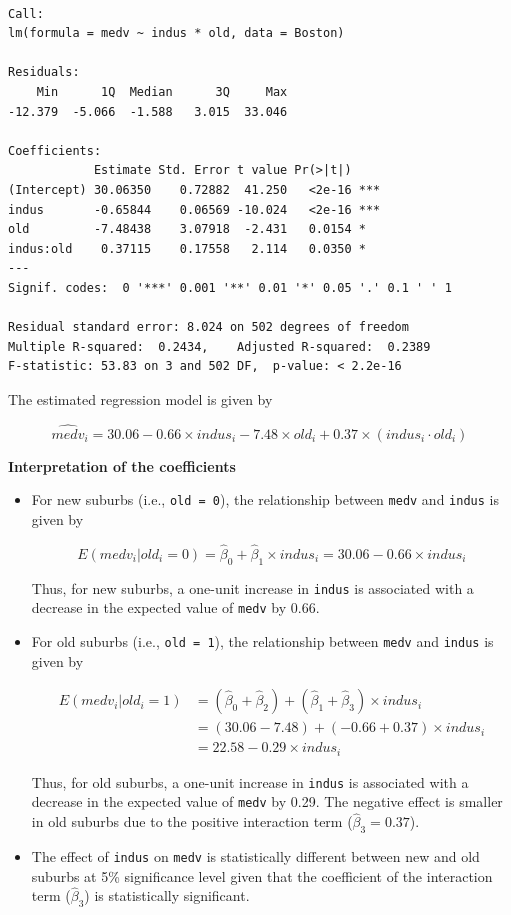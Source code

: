 \documentclass[
  12pt,
  letterpaper,
]{scrbook}
\theoremstyle{plain}
\theoremstyle{definition}
\theoremstyle{remark}
\begin{document}
\begin{verbatim}

Call:
lm(formula = medv ~ indus * old, data = Boston)

Residuals:
    Min      1Q  Median      3Q     Max 
-12.379  -5.066  -1.588   3.015  33.046 

Coefficients:
            Estimate Std. Error t value Pr(>|t|)    
(Intercept) 30.06350    0.72882  41.250   <2e-16 ***
indus       -0.65844    0.06569 -10.024   <2e-16 ***
old         -7.48438    3.07918  -2.431   0.0154 *  
indus:old    0.37115    0.17558   2.114   0.0350 *  
---
Signif. codes:  0 '***' 0.001 '**' 0.01 '*' 0.05 '.' 0.1 ' ' 1

Residual standard error: 8.024 on 502 degrees of freedom
Multiple R-squared:  0.2434,    Adjusted R-squared:  0.2389 
F-statistic: 53.83 on 3 and 502 DF,  p-value: < 2.2e-16
\end{verbatim}

The estimated regression model is given by

\[
\widehat{medv}_i = 30.06 - 0.66 \times indus_i - 7.48 \times old_i + 0.37 \times (indus_i \cdot old_i)
\]

{\textbf{Interpretation of the coefficients}}

\begin{itemize}
\item
  For new suburbs (i.e., \texttt{old\ =\ 0}), the relationship between
  \texttt{medv} and \texttt{indus} is given by

  \[
  E(medv_i | old_i = 0) = \hat{\beta}_0 + \hat{\beta}_1 \times indus_i = 30.06 - 0.66 \times indus_i
  \]

  Thus, for new suburbs, a one-unit increase in \texttt{indus} is
  associated with a decrease in the expected value of \texttt{medv} by
  0.66.
\item
  For old suburbs (i.e., \texttt{old\ =\ 1}), the relationship between
  \texttt{medv} and \texttt{indus} is given by

  \[
  \begin{split}
  E(medv_i | old_i = 1) &= (\hat{\beta}_0 + \hat{\beta}_2) + (\hat{\beta}_1 + \hat{\beta}_3) \times indus_i \\
  &= (30.06 - 7.48) + (-0.66 + 0.37) \times indus_i \\
  &= 22.58 - 0.29 \times indus_i
  \end{split}
  \]

  Thus, for old suburbs, a one-unit increase in \texttt{indus} is
  associated with a decrease in the expected value of \texttt{medv} by
  0.29. The negative effect is smaller in old suburbs due to the
  positive interaction term (\(\hat{\beta}_3 = 0.37\)).
\item
  The effect of \texttt{indus} on \texttt{medv} is statistically
  different between new and old suburbs at 5\% significance level given
  that the coefficient of the interaction term (\(\hat{\beta}_3\)) is
  statistically significant.
\end{itemize}
\end{document}
